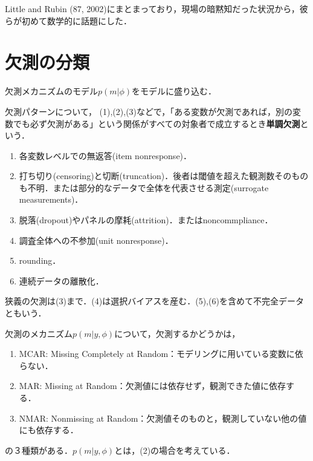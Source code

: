 \documentclass[uplatex,dvipdfmx]{jsreport}
\begin{document}
\begin{history}
    Little and Rubin (87, 2002)にまとまっており，現場の暗黙知だった状況から，彼らが初めて数学的に話題にした．
\end{history}

\section{欠測の分類}

\begin{tcolorbox}[colframe=ForestGreen, colback=ForestGreen!10!white,breakable,colbacktitle=ForestGreen!40!white,coltitle=black,fonttitle=\bfseries\sffamily,
title=]
    欠測メカニズムのモデル$p(m|\phi)$をモデルに盛り込む．
\end{tcolorbox}

\begin{definition}
    欠測パターンについて，
    (1),(2),(3)などで，「ある変数が欠測であれば，別の変数でも必ず欠測がある」という関係がすべての対象者で成立するとき\textbf{単調欠測}という．
\end{definition}

\begin{example}\mbox{}
    \begin{enumerate}
        \item 各変数レベルでの無返答(item nonresponse)．
        \item 打ち切り(censoring)と切断(truncation)．後者は閾値を超えた観測数そのものも不明．または部分的なデータで全体を代表させる測定(surrogate measurements)．
        \item 脱落(dropout)やパネルの摩耗(attrition)．またはnoncommpliance．
        \item 調査全体への不参加(unit nonresponse)．
        \item rounding．
        \item 連続データの離散化．
    \end{enumerate}
    狭義の欠測は(3)まで．(4)は選択バイアスを産む．(5),(6)を含めて不完全データともいう．
\end{example}

\begin{definition}[Rubin (76)]
    欠測のメカニズム$p(m|y,\phi)$について，欠測するかどうかは，
    \begin{enumerate}
        \item MCAR: Missing Completely at Random：モデリングに用いている変数に依らない．
        \item MAR: Missing at Random：欠測値には依存せず，観測できた値に依存する．
        \item NMAR: Nonmissing at Random：欠測値そのものと，観測していない他の値にも依存する．
    \end{enumerate}
    の３種類がある．$p(m|y,\phi)$とは，(2)の場合を考えている．
\end{definition}
\end{document}

